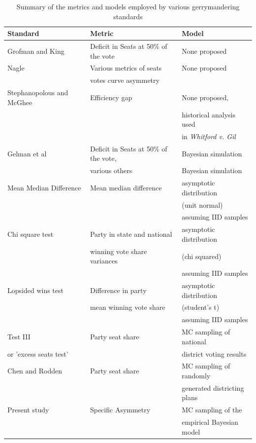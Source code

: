 \documentclass[preprint,12pt]{article}
\begin{document}
\begin{table}[htb!]
\centering
\caption{Summary of the metrics and models employed by various gerrymandering standards \label{tab:Stand}}
\begin{tabular}{|l|l|l|}
\hline
Standard & Metric & Model\\
\hline
\hline
Grofman and King & Deficit in Seats at 50\% of the vote & None proposed\\
\hline
Nagle & Various metrics of seats & None proposed\\
      & votes curve asymmetry &  \\
\hline
Stephanopolous and McGhee & Efficiency gap & None proposed,\\
                          &                & historical analysis used\\
                          &                & in \emph{Whitford v. Gil}\\
\hline
Gelman et al & Deficit in Seats at 50\% of the vote, & Bayesian simulation\\
             & various others & Bayesian simulation\\
\hline
Mean Median Difference & Mean median difference & asymptotic distribution \\
 &                                              & (unit normal) \\
 &                                              & assuming IID samples \\
\hline
Chi square test & Party in state and national  & asymptotic distribution  \\
                & winning vote share variances  & (chi squared) \\
                &   & assuming IID samples \\
\hline
Lopsided wins test & Difference in party  & asymptotic distribution  \\
                   &  mean winning vote share & (student's t) \\
                   &   & assuming IID samples \\
\hline
Test III \cite{Wang_2016_10.1089/elj.2016.0387} & Party seat share & MC sampling of national \\
or 'excess seats test'         &                  & district voting results\\
\hline
Chen and Rodden & Party seat share & MC sampling of randomly \\
         &                         & generated districting plans\\
\hline
Present study & Specific Asymmetry & MC sampling of the \\
              &                    & empirical Bayesian model\\
\hline
\end{tabular}
\end{table}
\end{document}
